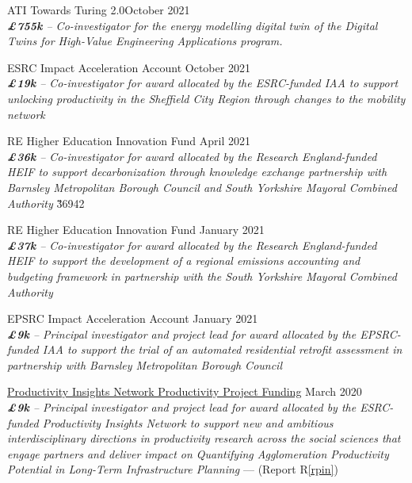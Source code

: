 \documentclass[10pt]{article}
\newcommand{\blankline}{\quad\pagebreak[3]}
\begin{document}
\blankline

ATI Towards Turing 2.0\hfill {October 2021}\\
\emph{\textbf{\pounds755k} -- Co-investigator for the energy modelling digital twin of the Digital Twins for High-Value Engineering Applications program.}
\FPset{}
\FPset{}

\blankline

ESRC Impact Acceleration Account \hfill {October 2021}\\
\emph{\textbf{\pounds19k} -- Co-investigator for award allocated by the ESRC-funded IAA to support unlocking productivity in the Sheffield City Region through changes to the mobility network}
\FPset{}
\FPset{}

\blankline

RE Higher Education Innovation Fund \hfill {April 2021}\\
\emph{\textbf{\pounds36k} -- Co-investigator for award allocated by the Research England-funded HEIF to support decarbonization through knowledge exchange partnership with Barnsley Metropolitan Borough Council and South Yorkshire Mayoral Combined Authority}
\FPset\v{36942}
\FPset{}

\blankline

RE Higher Education Innovation Fund \hfill {January 2021}\\
\emph{\textbf{\pounds37k} -- Co-investigator for award allocated by the Research England-funded HEIF to support the development of a regional emissions accounting and budgeting framework in partnership with the South Yorkshire Mayoral Combined Authority}
\FPset{}
\FPset{}

\blankline

EPSRC Impact Acceleration Account \hfill {January 2021}\\
\emph{\textbf{\pounds9k} -- Principal investigator and project lead for award allocated by the EPSRC-funded IAA to support the trial of an automated residential retrofit assessment in partnership with Barnsley Metropolitan Borough Council}
\FPset{}
\FPset{}

\blankline

\href{https://productivityinsightsnetwork.co.uk/projects/}{Productivity Insights Network Productivity Project Funding} \hfill {March 2020}\\
\emph{\textbf{\pounds9k} -- Principal investigator and project lead for award allocated by the ESRC-funded Productivity Insights Network to support new and ambitious interdisciplinary directions in productivity research across the social sciences that engage partners and deliver impact on Quantifying Agglomeration Productivity Potential in Long-Term Infrastructure Planning} --- (Report R\ref{rpin})
\FPset{}
\FPset{}
\end{document}
